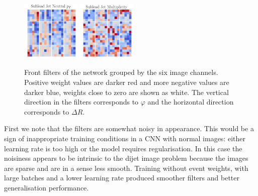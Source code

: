 \begin{figure}[h!]
\begin{center}
        \includegraphics[width=0.25\textwidth]{figures/event_selection/front_filters_channel_4.pdf}
        \includegraphics[width=0.25\textwidth]{figures/event_selection/front_filters_channel_5.pdf}
    \end{center}
    \caption{Front filters of the network grouped by the six image channels. Positive weight values are darker red and more negative values are darker blue, weights close to zero are shown as white. The vertical direction in the filters corresponds to $\varphi$ and the horizontal direction corresponds to $\Delta{R}$.}
    \label{fig:event_categorisation:front_filters}
\end{figure}

First we note that the filters are somewhat noisy in appearance. This would be a sign of inappropriate training conditions in a CNN with normal images: either learning rate is too high or the model requires regularisation. 
In this case the noisiness appears to be intrinsic to the dijet image problem because the images are sparse and are in a sense less smooth. Training without event weights, with large batches and a lower learning rate produced smoother filters and better generalisation performance.  

